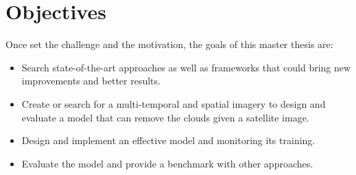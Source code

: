\documentclass[11pt, a4paper]{article}
\begin{document}
	\section*{Objectives}
	Once set the challenge and the motivation, the goals of this master thesis are:
	\begin{itemize}
		\item Search state-of-the-art approaches as well as frameworks that could bring new improvements and better results.
		\item Create or search for a multi-temporal and spatial imagery to design and evaluate a model that can remove the clouds given a satellite image.
		\item Design and implement an effective model and monitoring its training.
		\item Evaluate the model and provide a benchmark with other approaches.
	\end{itemize}
	\newpage
\end{document}
